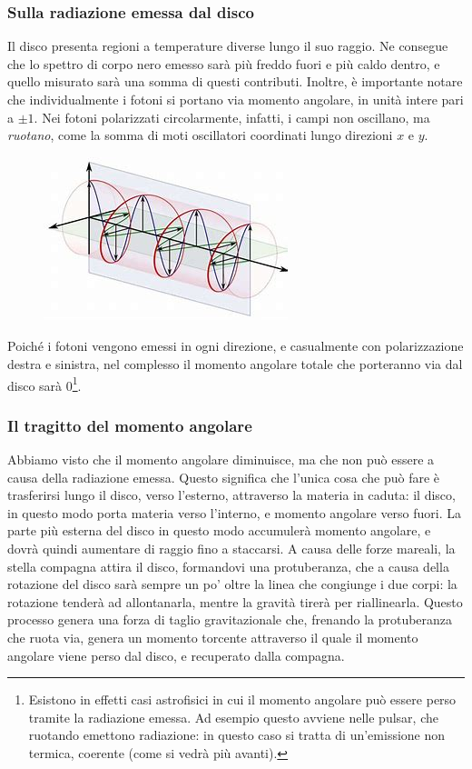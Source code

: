 \subsubsection{Sulla radiazione emessa dal disco}
Il disco presenta regioni a temperature diverse lungo il suo raggio. 
Ne consegue che lo spettro di corpo nero emesso sarà più freddo fuori e più caldo dentro, e quello misurato sarà una somma di questi contributi.
Inoltre, è importante notare che individualmente i fotoni si portano via momento angolare, in unità intere pari a $\pm 1$.
Nei fotoni polarizzati circolarmente, infatti, i campi non oscillano, ma \textit{ruotano}, come la somma di moti oscillatori coordinati lungo direzioni $x$ e $y$.
\begin{figure}[h!]
    \centering
    \includegraphics[width=0.5\linewidth]{Immagini/circular_polarization.jpeg}
    \label{fig:enter-label}
\end{figure}
Poiché i fotoni vengono emessi in ogni direzione, e casualmente con polarizzazione destra e sinistra, nel complesso il momento angolare totale che porteranno via dal disco sarà 0\footnote{Esistono in effetti casi astrofisici in cui il momento angolare può essere perso tramite la radiazione emessa. Ad esempio questo avviene nelle pulsar, che ruotando emettono radiazione: in questo caso si tratta di un'emissione non termica, coerente (come si vedrà più avanti).}.
\subsubsection{Il tragitto del momento angolare}
Abbiamo visto che il momento angolare diminuisce, ma che non può essere a causa della radiazione emessa. 
Questo significa che l'unica cosa che può fare è trasferirsi lungo il disco, verso l'esterno, attraverso la materia in caduta:
il disco, in questo modo porta materia verso l'interno, e momento angolare verso fuori.
La parte più esterna del disco in questo modo accumulerà momento angolare, e dovrà quindi aumentare di raggio fino a staccarsi.
A causa delle forze mareali, la stella compagna attira il disco, formandovi una protuberanza, che a causa della rotazione del disco sarà sempre un po' oltre la linea che congiunge i due corpi: la rotazione tenderà ad allontanarla, mentre la gravità tirerà per riallinearla.
Questo processo genera una forza di taglio gravitazionale che, frenando la protuberanza che ruota via, genera un momento torcente attraverso il quale il momento angolare viene perso dal disco, e recuperato dalla compagna. 
